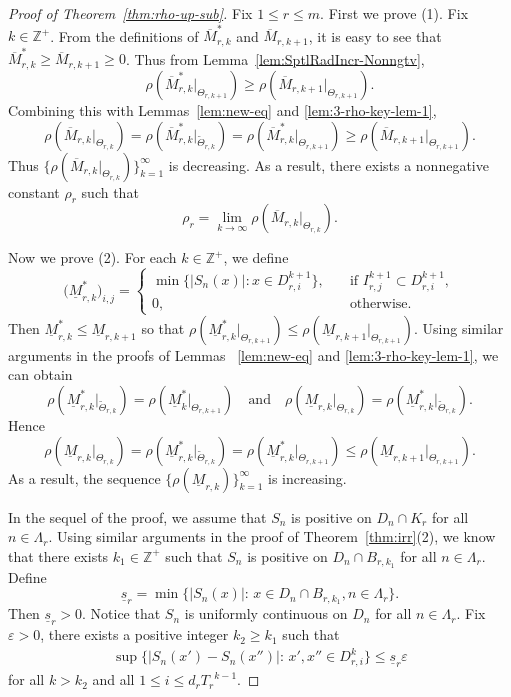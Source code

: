 \documentclass[11pt]{amsart}
\theoremstyle{definition}
\theoremstyle{remark}
\numberwithin{equation}{section}
\newcommand{\bZp}{{{\mathbb Z}^+}}
\newcommand{\Z}{{\mathbb Z}}
\newcommand{\upM}{{\overline{M}}}
\newcommand{\lowM}{{\underline{M}}}
\newcommand{\lows}{{\underline{s}}}
\newcommand{\uprho}{{{\rho}}}
\def\vep{\varepsilon}
\def\wdt{\widetilde}
\begin{document}
	
\begin{proof}[Proof of Theorem~\ref{thm:rho-up-sub}]
Fix $1 \leq r \leq m$. First we prove (1). Fix $k \in \mathbb{Z}^+$. From the definitions of $\upM_{r,k}^*$ and $\upM_{r,k+1}$, it is easy to see that $\upM_{r,k}^* \geq \upM_{r,k+1}\geq 0$. Thus from Lemma~\ref{lem:SptlRadIncr-Nonngtv},
\[
	\rho( \upM_{r,k}^*|_{\Theta_{r,k+1}}) \geq \rho(\upM_{r,k+1}|_{\Theta_{r,k+1}}).
\]
Combining this with Lemmas~\ref{lem:new-eq} and \ref{lem:3-rho-key-lem-1}, 
\[ 
  \rho(\upM_{r,k}|_{\Theta_{r,k}})
  = \rho( \upM_{r,k}^*|_{\wdt {\Theta}_{r,k}})
  = \rho(\upM_{r,k}^*|_{{\Theta_{r,k+1}}}) 
   \geq \rho(\upM_{r,k+1}|_{{\Theta_{r,k+1}}}).
\]
Thus $\{\rho(\upM_{r,k}|_{\Theta_{r,k}})\}_{k=1}^\infty$ is decreasing. As a result, there exists a nonnegative constant $\uprho_r$ such that
$$ \uprho_r=\lim_{k  \to \infty}\rho(\upM_{r,k}|_{\Theta_{r,k}}).$$


Now we prove (2). For each $k \in \Z^+$, we define
	\begin{equation*}
		\big(\lowM_{r,k}^*\big)_{i,j}= 
		\begin{cases}
			\min \big\{ \big| S_n(x) \big|: x \in D_{r,i}^{k+1}\big\} ,\quad & \mbox{if } I_{r,j}^{k+1}\subset D_{r,i}^{k+1}, \\
			0, \quad & \mbox{otherwise}.
		\end{cases}
	\end{equation*}
	Then $\lowM_{r,k}^* \leq \lowM_{r,k+1}$ so that
	$
	\rho( \lowM_{r,k}^*|_{\Theta_{r,k+1}}) \leq \rho(\lowM_{r,k+1}|_{\Theta_{r,k+1}}).
	$
	Using similar arguments in the proofs of Lemmas ~\ref{lem:new-eq} and \ref{lem:3-rho-key-lem-1},
	we can obtain
	\[ 
	  \rho(\lowM_{r,k}^*|_{\wdt {\Theta}_{r,k}}) = \rho(\lowM_{k}^*|_{{\Theta_{r,k+1}}}) \quad \mbox{and} \quad
	  \rho(\lowM_{r,k}|_{\Theta_{r,k}}) = \rho( \lowM_{r,k}^*|_{\wdt {\Theta}_{r,k}}).
	\]
	Hence
	$$	 \rho(\lowM_{r,k}|_{\Theta_{r,k}}) =\rho( \lowM_{r,k}^*|_{\wdt {\Theta}_{r,k}})=\rho( \lowM_{r,k}^*|_{{\Theta_{r,k+1}}}) \leq \rho(\lowM_{r,k+1}|_{{\Theta_{r,k+1}}}).$$
	As a result, the sequence $\{ \rho(\lowM_{r,k}) \}_{k=1}^\infty$ is increasing.


In the sequel of the proof, we assume that $S_n$ is positive on $D_n \cap K_r$ for all $n\in \Lambda_r$. Using similar arguments in the proof of Theorem~\ref{thm:irr}(2), we know that there exists $k_1\in \bZp$ such that $S_n$ is positive on $D_n \cap B_{r,k_1}$ for all $n\in \Lambda_r$. Define
\[
  \lows_r=\min\{ |S_n(x)|:\, x\in  D_n\cap B_{r,k_1},  n \in \Lambda_r \}.
\]
Then $\lows_r>0$.
Notice that $S_n$ is uniformly continuous on $D_n$ for all $n\in \Lambda_r$.
Fix $\vep>0$, there exists a positive integer $k_2\geq k_1$ such that 
\begin{align*}
	\sup\big\{ |S_n(x')-S_n(x'')|:\, x',x''\in D_{r,i}^k\big\} \leq \lows_r\vep
\end{align*}
for all $k>k_2$ and all $1\leq i\leq d_r {T_r}^{k-1}$.


\end{proof}
\end{document}
